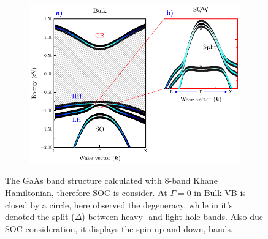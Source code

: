 \begin{figure}[h!]
	\centering
	\begin{subfigure}{\textwidth}
		\includegraphics[width=\linewidth]{../figures/chapter-2/numerical-calculations/out/kp-bands}
		\label{subfig:chapter2-sec-numerical-calculations-kp-bands-bulk-a}
		\label{subfig:chapter2-sec-numerical-calculations-kp-bands-sqw-b}
	\end{subfigure}
	\caption[ The GaAs band structure calculated with 8-band Khane Hamiltonian\cite{kane1957bandstructure,novik2005bandstructure}]
	{
	 The GaAs band structure calculated with 8-band Khane Hamiltonian\cite{kane1957bandstructure,novik2005bandstructure}, therefore SOC is consider. At $\Gamma = 0$ in Bulk VB is closed by a circle, here observed the degeneracy, while in  it's denoted the split ($\Delta$) between heavy- and light hole bands. Also due SOC consideration, it displays the spin up and down, bands. 
	}\label{fig:chapter2-sec-numerical-calculations-kp-bands}
\end{figure}


